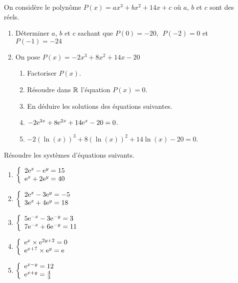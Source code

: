   \begin{exercice}
 
  On considère le polynôme $ P(x)=ax^{3}+bx^{2}+14x+c$\; où $ a$, $ b $ et $ c $  sont des réels.
\begin{enumerate}
\item Déterminer  $ a$, $ b $ et $ c $ sachant que   $ P(0)=-20 $,  $ \;P(-2)=0 $ et $ P(-1)=-24 $
\item On pose $ P(x)=-2x^{3}+8x^{2}+14x-20$
\begin{enumerate}
\item Factoriser $  P(x) $.
\item Résoudre dans $ \mathbb{R} $  l'équation $ P(x)=0 $.
\item En déduire les  solutions des équations  suivantes.
\item $ -2\mathrm{e}^{3x}+8\mathrm{e}^{2x}+14\mathrm{e}^{x}-20=0 $.
\item $ -2(\ln(x))^{3}+8(\ln(x))^{2}+14\ln(x)-20=0 $.
\end{enumerate}
\end{enumerate}
 \end{exercice}
 
  
  \begin{exercice}
Résoudre les systèmes d'équations suivants.

\begin{enumerate}
\item $  \left\{\begin{array}{l}2\mathrm{e}^{x}-\mathrm{e}^{y}=15  \\ \mathrm{e}^{x}+2\mathrm{e}^{y} =40 \end{array}\right.$
\item $  \left\{\begin{array}{l}2\mathrm{e}^{x}-3\mathrm{e}^{y}=-5  \\ 3\mathrm{e}^{x}+4\mathrm{e}^{y} =18 \end{array}\right.$
\item $  \left\{\begin{array}{l}5\mathrm{e}^{-x}-3\mathrm{e}^{-y}=3  \\ 7\mathrm{e}^{-x}+6\mathrm{e}^{-y} =11 \end{array}\right.$
\item $  \left\{\begin{array}{l}\mathrm{e}^{x}\times\mathrm{e}^{2y+2}=0  \\ \mathrm{e}^{x+7}\times\mathrm{e}^{y} = \mathrm{e}^{}\end{array}\right.$
\item $  \left\{\begin{array}{l}\mathrm{e}^{x-y}=12 \\ \mathrm{e}^{x+y} =\frac{4}{3} \end{array}\right.$
\end{enumerate}

  \end{exercice}
  
